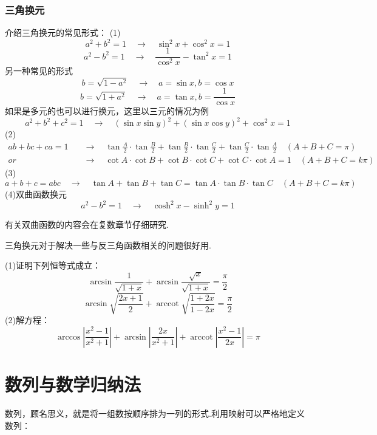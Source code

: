 \documentclass[lang=cn, zihao=5]{elegantbook}
\DeclareMathOperator{\arccot}{arccot}
\begin{document}
\subsection{三角换元}

介绍三角换元的常见形式：
    (1)
    $$a^2+b^2=1 \quad \longrightarrow \quad \sin^2{x}+\cos^2{x}=1$$
    $$a^2-b^2=1 \quad \longrightarrow \quad \frac{1}{\cos^2 x}-\tan^2 {x}=1$$
    另一种常见的形式
    $$b=\sqrt{1-a^2} \quad \longrightarrow \quad a=\sin{x} , b=\cos{x}$$
    $$b=\sqrt{1+a^2} \quad \longrightarrow \quad a=\tan{x} , b=\frac{1}{\cos{x}}$$
    如果是多元的也可以进行换元，这里以三元的情况为例
    $$a^2+b^2+c^2=1 \quad \longrightarrow \quad (\sin{x}\sin{y})^2+(\sin{x}\cos{y})^2+\cos^2{x}=1$$
    (2)
    \begin{align*}
        ab+bc+ca=1 \quad & \longrightarrow \quad \tan{\frac{A}{2}} \cdot \tan{\frac{B}{2}} + \tan{\frac{B}{2}} \cdot \tan{\frac{C}{2}} + \tan{\frac{C}{2}} \cdot \tan{\frac{A}{2}} \quad (A+B+C=\pi) \\
        or & \longrightarrow \quad \cot{A} \cdot \cot{B} + \cot{B} \cdot \cot{C} + \cot{C} \cdot \cot{A} = 1 \quad (A+B+C=k\pi)
    \end{align*}
    (3)$$a+b+c=abc \quad \longrightarrow \quad \tan{A}+\tan{B}+\tan{C}=\tan{A} \cdot \tan{B} \cdot \tan{C} \quad (A+B+C=k\pi)$$
    (4)双曲函数换元
    $$a^2-b^2=1 \quad \longrightarrow \quad \cosh^2{x}-\sinh^2{y}=1$$

\begin{remark}
	有关双曲函数的内容会在复数章节仔细研究.
\end{remark}

三角换元对于解决一些与反三角函数相关的问题很好用.

\begin{example}
	(1)证明下列恒等式成立：
	$$\arcsin \frac{1}{\sqrt{1+x}} + \arcsin \frac{\sqrt{x}}{\sqrt{1+x}} = \frac{\pi}{2}$$
	$$\arcsin \sqrt{\frac{2x+1}{2}} + \arccot \sqrt{\frac{1+2x}{1-2x}} = \frac{\pi}{2}$$
	(2)解方程：$$\arccos \left| \frac{x^2-1}{x^2+1} \right| + \arcsin \left| \frac{2x}{x^2+1} \right| + \arccot \left| \frac{x^2-1}{2x} \right| = \pi$$
\end{example}



\chapter{数列与数学归纳法}

数列，顾名思义，就是将一组数按顺序排为一列的形式.利用映射可以严格地定义数列：
\end{document}
